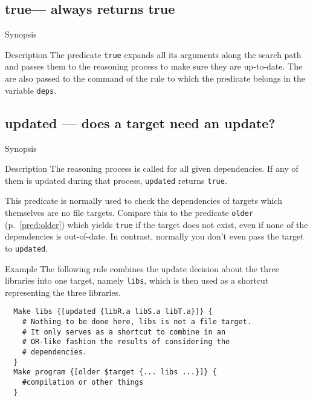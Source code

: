 \documentclass[11pt,bibtotoc,idxtotoc]{scrreprt}
\begin{document}
\subsection{true--- always returns true}
\begin{Describe}
\item[Synopsis]  
\item[Description] The predicate \texttt{true} expands all its
  arguments along the search path and passes them to the reasoning
  process to make sure they are up-to-date. The are also passed to the
  command of the rule to which the predicate belongs in the variable
  \texttt{deps}.
\end{Describe}

\subsection{updated --- does a target need an update?}

\label{pred:updated}
\begin{Describe}
\item[Synopsis]  
\item[Description] The reasoning process is called for all given
  dependencies. If any of them is updated during that process,
  \texttt{updated} returns \texttt{true}. 
  
  This predicate is normally used to check the dependencies of targets
  which themselves are no file targets. Compare this to the predicate
  \texttt{older} (p.~\ref{pred:older}) which yields \texttt{true} if
  the target does not exist, even if none of the dependencies is
  out-of-date. In contrast, normally you don't even pass the target to
  \texttt{updated}.
  
\item[Example] The following rule combines the update decision about
  the three libraries into one target, namely \texttt{libs}, which is
  then used as a shortcut representing the three libraries.
\begin{verbatim}
  Make libs {[updated {libR.a libS.a libT.a}]} {
    # Nothing to be done here, libs is not a file target. 
    # It only serves as a shortcut to combine in an 
    # OR-like fashion the results of considering the 
    # dependencies.
  }
  Make program {[older $target {... libs ...}]} {
    #compilation or other things
  }
\end{verbatim}

\end{Describe}
\end{document}
